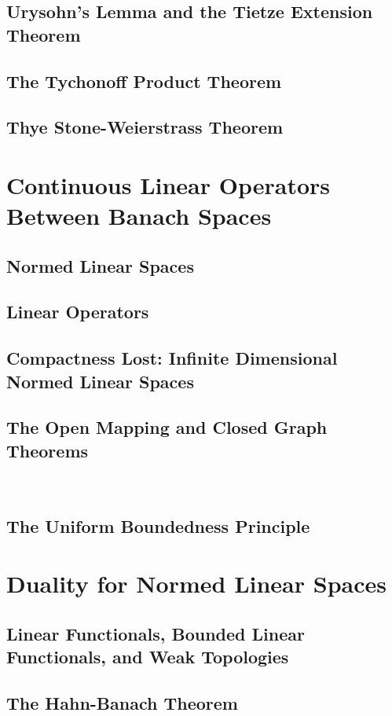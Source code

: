 \documentclass[a4paper,10pt]{book}
\theoremstyle{plain} %
\begin{document}
\section{Urysohn's Lemma and the Tietze Extension Theorem}
\section{The Tychonoff Product Theorem}
\section{Thye Stone-Weierstrass Theorem}

\chapter{Continuous Linear Operators Between Banach Spaces}

\section{Normed Linear Spaces}
\section{Linear Operators}
\section{Compactness Lost: Infinite Dimensional Normed Linear Spaces}
\section{The Open Mapping and Closed Graph Theorems}\
\section{The Uniform Boundedness Principle}

\chapter{Duality for Normed Linear Spaces}

\section{Linear Functionals, Bounded Linear Functionals, and Weak Topologies}
\section{The Hahn-Banach Theorem}
\end{document}
